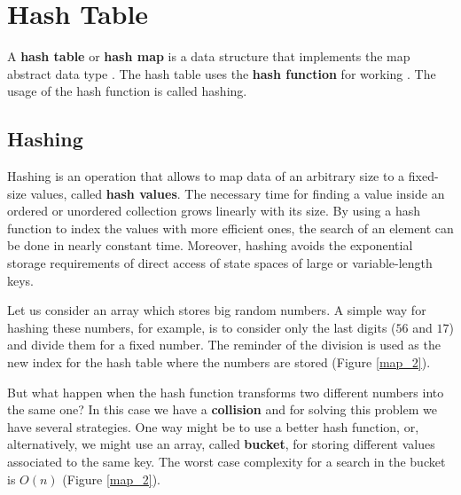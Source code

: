 \section{Hash Table}
A \textbf{hash table} or \textbf{hash map} is a data structure that implements the map abstract data type \cite{wikihashtable}. The hash table uses the \textbf{hash function} for working \cite{wikihashfunction}. The usage of the hash function is called hashing.

\subsection{Hashing}
Hashing is an operation that allows to map data of an arbitrary size to a fixed-size values, called \textbf{hash values}. The necessary time for finding a value inside an ordered or unordered collection grows linearly with its size. By using a hash function to index the values with more efficient ones, the search of an element can be done in nearly constant time. Moreover, hashing avoids the exponential storage requirements of direct access of state spaces of large or variable-length keys.

Let us consider an array which stores big random numbers. A simple way for hashing these numbers, for example, is to consider only the last digits (\(56\) and \(17\)) and divide them for a fixed number. The reminder of the division is used as the new index for the hash table where the numbers are stored (Figure \ref{map_2}).

But what happen when the hash function transforms two different numbers into the same one? In this case we have a \textbf{collision} and for solving this problem we have several strategies. One way might be to use a better hash function, or, alternatively, we might use an array, called \textbf{bucket}, for storing different values associated to the same key. The worst case complexity for a search in the bucket is \(O(n)\) (Figure \ref{map_2}).

